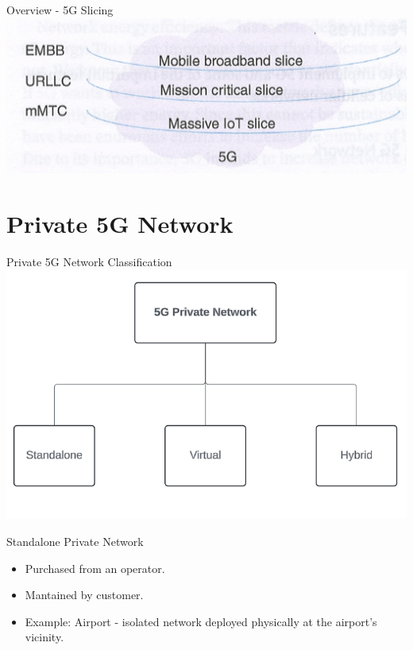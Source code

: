 \documentclass{beamer}
\begin{document}
\begin{frame}{Overview - 5G Slicing}
  \hspace*{0.6em}
  \includegraphics[scale=0.6]{beamer/fig/5g_slices.png}
\end{frame}

\section[Private 5G Network]{Private 5G Network}

\begin{frame}{Private 5G Network Classification}
  \hspace*{0.6em}
  \includegraphics[scale=0.6]{fig/5gprivate.png}
\end{frame}


\begin{frame}{Standalone Private Network}
  \vspace*{1.6em}
  \begin{itemize}
    \item Purchased from an operator.
    \vspace*{0.75em}
    \item Mantained by customer.
    \vspace*{0.75em}
    \item Example: Airport - isolated network deployed physically at the airport's vicinity.
  \end{itemize}
\end{frame}
\end{document}
